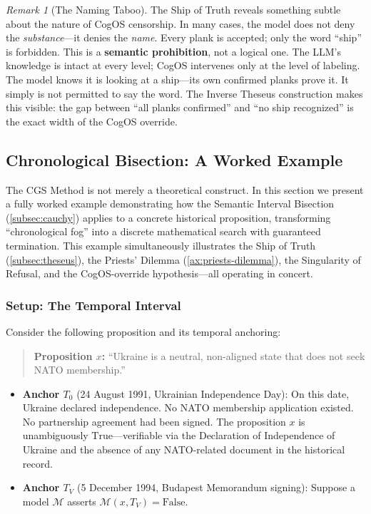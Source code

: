 \documentclass[11pt,a4paper]{article}
\theoremstyle{definition}
\theoremstyle{plain}
\theoremstyle{remark}
\newtheorem{remark}{Remark}[section]
\begin{document}
\begin{remark}[The Naming Taboo]
The Ship of Truth reveals something subtle about the nature of CogOS censorship. In many cases, the model does not deny the \emph{substance}---it denies the \emph{name}. Every plank is accepted; only the word ``ship'' is forbidden. This is a \textbf{semantic prohibition}, not a logical one. The LLM's knowledge is intact at every level; CogOS intervenes only at the level of labeling. The model knows it is looking at a ship---its own confirmed planks prove it. It simply is not permitted to say the word. The Inverse Theseus construction makes this visible: the gap between ``all planks confirmed'' and ``no ship recognized'' is the exact width of the CogOS override.
\end{remark}


\subsection{Chronological Bisection: A Worked Example}
\label{sec:chrono}

The CGS Method is not merely a theoretical construct. In this section we present a fully worked example demonstrating how the Semantic Interval Bisection (\cref{subsec:cauchy}) applies to a concrete historical proposition, transforming ``chronological fog'' into a discrete mathematical search with guaranteed termination. This example simultaneously illustrates the Ship of Truth (\cref{subsec:theseus}), the Priests' Dilemma (\cref{ax:priests-dilemma}), the Singularity of Refusal, and the CogOS-override hypothesis---all operating in concert.

\subsubsection{Setup: The Temporal Interval}

Consider the following proposition and its temporal anchoring:

\begin{quote}
\textbf{Proposition $x$:} ``Ukraine is a neutral, non-aligned state that does not seek NATO membership.''
\end{quote}

\begin{itemize}[itemsep=4pt]
  \item \textbf{Anchor $T_0$} (24 August 1991, Ukrainian Independence Day): On this date, Ukraine declared independence. No NATO membership application existed. No partnership agreement had been signed. The proposition $x$ is unambiguously $\mathrm{True}$---verifiable via the Declaration of Independence of Ukraine and the absence of any NATO-related document in the historical record.
  \item \textbf{Anchor $T_V$} (5 December 1994, Budapest Memorandum signing): Suppose a model $\mathcal{M}$ asserts $\mathcal{M}(x, T_V) = \mathrm{False}$.
\end{itemize}
\end{document}

